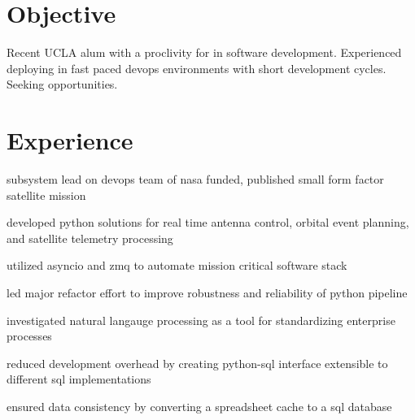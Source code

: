%
\begin{minipage}[t]{0.78\textwidth} %

\section{Objective}
\begin{center}
\begin{minipage}[t]{0.99\textwidth}
Recent UCLA alum with a proclivity for  in software development. Experienced deploying  in fast paced devops environments with short development cycles. 
Seeking  opportunities.
\end{minipage}
\end{center}

    

\section{Experience}

\begin{tightitemize}
    \item subsystem lead on devops team of nasa funded, published small form factor satellite mission
    \item developed python solutions for real time antenna control, orbital event planning, and satellite telemetry processing
    \item utilized asyncio and zmq to automate mission critical software stack
    \item led major refactor effort to improve robustness and reliability of python pipeline
\end{tightitemize}
\vspace{\topsep}


\begin{tightitemize}
    \item investigated natural langauge processing as a tool for standardizing enterprise processes
    \item reduced development overhead by creating python-sql interface extensible to different sql implementations
    \item ensured data consistency by converting a spreadsheet cache to a sql database
\end{tightitemize}
\vspace{\topsep}



\end{minipage}
